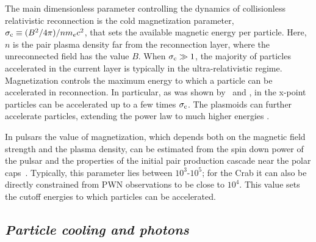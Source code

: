 The main dimensionless parameter controlling the dynamics of collisionless relativistic reconnection is the cold magnetization parameter, $\sigma_{\rm c}\equiv (B^2/4\pi) / n m_e c^2$, that sets the available magnetic energy per particle. Here, $n$ is the pair plasma density far from the reconnection layer, where the unreconnected field has the value $B$. When $\sigma_{\rm c}\gg 1$, the majority of particles accelerated in the current layer is typically in the ultra-relativistic regime.
Magnetization controls the maximum energy to which a particle can be accelerated in reconnection. In particular, as was shown by~\cite{2014ApJ...783L..21S} and \cite{2016ApJ...816L...8W}, in the x-point particles can be accelerated up to a few times $\sigma_{\rm c}$. The plasmoids can further accelerate particles, extending the power law to much higher energies \citep{2001ApJ...562L..63Z, 2016MNRAS.462...48S, 2016ApJ...818L...9G, 2018arXiv180800966P}.

In pulsars the value of magnetization, which
depends both on the magnetic field strength and the plasma density, can be estimated from the spin down power of the pulsar and the properties of the initial pair production cascade near the polar caps~\citep{1983AIPC..101..163A, 1995phpu.book.....L, 2001ApJ...547..437L, 2010MNRAS.406.1379M, 2010MNRAS.408.2092T}. Typically, this parameter lies between $10^3\text{-}10^5$; for the Crab it can also be directly constrained from PWN observations to be close to $10^4$. This value sets the cutoff energies to which particles can be accelerated.



\subsection*{\small\it Particle cooling and photons}

